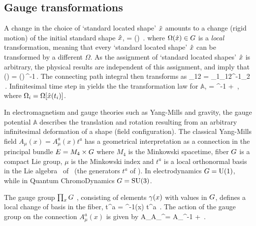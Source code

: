 \subsection{Gauge transformations}
\label{sec:GaugeTransf}

A change in the choice of `standard located shape' $\tilde{x}$
amounts to a change (rigid motion) of the initial standard shape $\hat{x}$,
\beq
\tilde{\ssp} = \Omega(\sspRed) \sspRed
\,.
where $\Omega(\hat{x}) \in G$ is a \emph{local} transformation, meaning that
every `standard located shape' $\hat{x}$ can be transformed by a different
$\Omega$.
As the assignment of `standard located shapes' $\hat{x}$ is arbitrary, the
physical results are independent of this assignment,
 and  imply
that
\beq
\tilde{\LieEl}(\zeit) = {\LieEl}(\zeit)\,\Omega^{-1}\left[\sspRed(\zeit)\right]
\,.
The connecting path integral then transforms as
\beq
\tilde{\LieEl}_{12} = \Omega_{1}\LieEl_{12}\Omega^{-1}_{2}
\,.
Infinitesimal time step in  yields the
the transformation law for $\mathbb{A}$,
\beq
{} = \Omega^{-1}
    +\Omega{}
\,,
where $\Omega_{i}= \Omega[\hat{x}(t_i)]$.

In electromagnetism and gauge theories such as Yang-Mills and gravity,
the gauge potential $\mathbb{A}$ describes the translation and rotation resulting
from an arbitrary infinitesimal deformation of a shape (field
configuration).
%
The classical Yang-Mills field $A_\mu(x)=A_\mu^a(x)t^a$
has a geometrical interpretation as a connection in the principal bundle $E=M_4 \times G$ where $M_4$ is the Minkowski spacetime, fiber $G$ is a compact Lie group, $\mu$ is the Minkowski index
and $t^a$ is a local orthonormal basis in the Lie algebra
\LieAlg\ of \Group\ (the generators $t^a$ of \LieAlg).
In electrodynamics $G=\textrm{U}(1)$, while in Quantum ChromoDynamics $G=\textrm{SU}(3)$.

The gauge group $\prod_x G$ , consisting of elements $\gamma(x)$ with values in $G$, defines a local change of basis in the fiber,
\beq
t^a = \Omega^{-1}(x) t^a
\,.
The action of the gauge group on the connection $A_\mu^a(x)$  is given by
\beq
A_\mu \to A_\mu^\Omega = \Omega A_\mu\Omega^{-1}
    +\Omega{}
\,.


